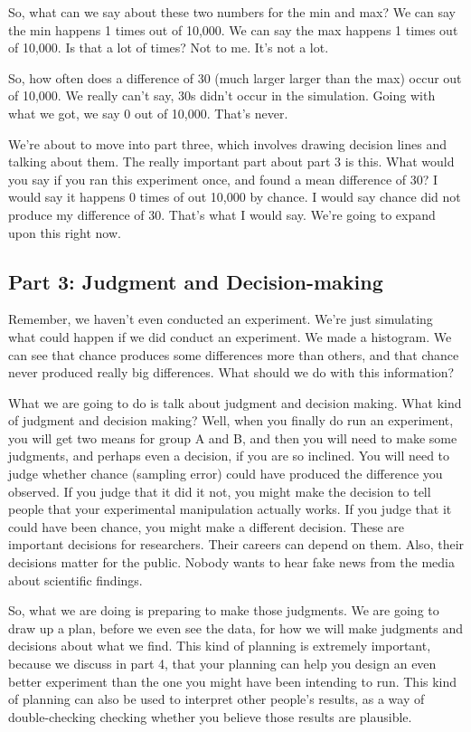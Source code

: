 \documentclass[
]{book}
\begin{document}
So, what can we say about these two numbers for the min and max? We can say the min happens 1 times out of 10,000. We can say the max happens 1 times out of 10,000. Is that a lot of times? Not to me. It's not a lot.

So, how often does a difference of 30 (much larger larger than the max) occur out of 10,000. We really can't say, 30s didn't occur in the simulation. Going with what we got, we say 0 out of 10,000. That's never.

We're about to move into part three, which involves drawing decision lines and talking about them. The really important part about part 3 is this. What would you say if you ran this experiment once, and found a mean difference of 30? I would say it happens 0 times of out 10,000 by chance. I would say chance did not produce my difference of 30. That's what I would say. We're going to expand upon this right now.

\subsection{Part 3: Judgment and Decision-making}\label{part-3-judgment-and-decision-making}

Remember, we haven't even conducted an experiment. We're just simulating what could happen if we did conduct an experiment. We made a histogram. We can see that chance produces some differences more than others, and that chance never produced really big differences. What should we do with this information?

What we are going to do is talk about judgment and decision making. What kind of judgment and decision making? Well, when you finally do run an experiment, you will get two means for group A and B, and then you will need to make some judgments, and perhaps even a decision, if you are so inclined. You will need to judge whether chance (sampling error) could have produced the difference you observed. If you judge that it did it not, you might make the decision to tell people that your experimental manipulation actually works. If you judge that it could have been chance, you might make a different decision. These are important decisions for researchers. Their careers can depend on them. Also, their decisions matter for the public. Nobody wants to hear fake news from the media about scientific findings.

So, what we are doing is preparing to make those judgments. We are going to draw up a plan, before we even see the data, for how we will make judgments and decisions about what we find. This kind of planning is extremely important, because we discuss in part 4, that your planning can help you design an even better experiment than the one you might have been intending to run. This kind of planning can also be used to interpret other people's results, as a way of double-checking checking whether you believe those results are plausible.
\end{document}
